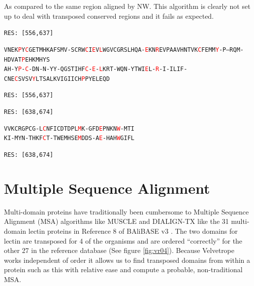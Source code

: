 \documentclass[phd,tocprelim]{cornell}
\begin{document}
As compared to the same region aligned by NW. This algorithm is clearly not set up to deal with transposed conserved regions and it fails as expected.

\begin{flushleft}
\singlespacing
\footnotesize
 
\texttt{RES: [556,637]}

\texttt{VNEK\textcolor{red}{P}Y\textcolor{red}{C}GETMHKAFSMV-SCRW\textcolor{red}{C}I\textcolor{red}{E}V\textcolor{red}{L}WGVCGRSLHQA-\textcolor{red}{E}KN\textcolor{red}{R}EVPAAVHNTVK\textcolor{red}{C}FEMM\textcolor{red}{Y}-P--RQM-HDVAT\textcolor{red}{P}EHKMHYS} \\
\texttt{AH-Y\textcolor{red}{P}-\textcolor{red}{C}-DN-N-YY-QGSTIHF\textcolor{red}{C}-\textcolor{red}{E}-\textcolor{red}{L}KRT-WQN-YTWI\textcolor{red}{E}L-\textcolor{red}{R}-I-ILIF-CNE\textcolor{red}{C}SVSV\textcolor{red}{Y}LTSALKVIGIICH\textcolor{red}{P}PYELEQD}

\texttt{RES: [556,637]}

\texttt{RES: [638,674]}

\texttt{VVKCRGPCG-L\textcolor{red}{C}NFICDTDPL\textcolor{red}{M}K-GFD\textcolor{red}{E}PNKN\textcolor{red}{W}-MTI} \\
\texttt{KI-MYN-THKF\textcolor{red}{C}T-TWEMHSE\textcolor{red}{M}DDS-A\textcolor{red}{E}-HAH\textcolor{red}{W}GIFL}

\texttt{RES: [638,674]}

\normalsize
\normalspacing
\end{flushleft}

\section{Multiple Sequence Alignment}

Multi-domain proteins have traditionally been cumbersome to Multiple Sequence Alignment (MSA) algorithms like MUSCLE \cite{MUSCLE} and DIALIGN-TX \cite{DIALIGN-TX} like the 31 multi-domain lectin proteins in Reference 8 of BAliBASE v3 \cite{Balibase}. The two domains for lectin are transposed for 4 of the organisms and are ordered ``correctly'' for the other 27 in the reference database (See figure \ref{fig:vr04}). Because Velvetrope works independent of order it allows us to find transposed domains from within a protein such as this with relative ease and compute a probable, non-traditional MSA.
\end{document}
